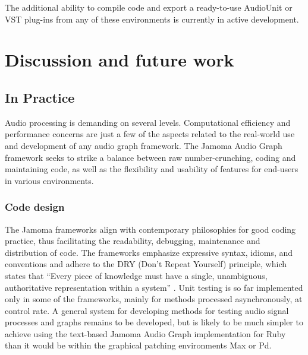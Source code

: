 \documentclass[twoside,a4paper]{article}
\begin{document}
The additional ability to compile code and export a ready-to-use AudioUnit or VST plug-ins from any of these environments is currently in active development.





%
\section{Discussion and future work} %
%

\subsection{In Practice} %

Audio processing is demanding on several levels.  
Computational efficiency and performance concerns are just a few of the aspects related to the real-world use and development of any audio graph framework. 
The Jamoma Audio Graph framework seeks to strike a balance between raw number-crunching, coding and maintaining code, as well as the flexibility and usability of features for end-users in various environments.


\subsubsection{Code design} %

The Jamoma frameworks align with contemporary philosophies for good coding practice, thus facilitating the readability, debugging, maintenance and distribution of code.
The frameworks emphasize expressive syntax, idioms, and conventions \cite{Martin:2009} and adhere to the DRY (Don't Repeat Yourself) principle, which states that ``Every piece of knowledge must have a single, unambiguous, authoritative representation within a system'' \cite{Hunt:1999}.
Unit testing  \cite{Martin:2009} is so far implemented only in some of the frameworks, mainly for methods processed asynchronously, at control rate.
A general system for developing methods for testing audio signal processes and graphs remains to be developed, but is likely to be much simpler to achieve using the text-based Jamoma Audio Graph implementation for Ruby than it would be within the graphical patching environments Max or Pd.
\end{document}
